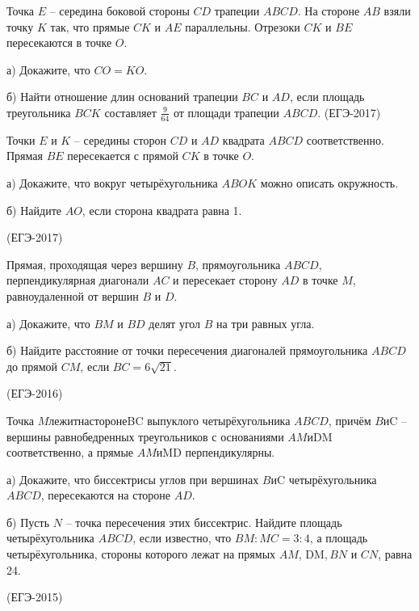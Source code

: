 \documentclass[c,12pt]{beamer}  %
\begin{document}
	\begin{frame}
		\begin{block}{}
			Точка $E$ – середина боковой стороны $CD$ трапеции $ABCD$. На
			стороне $AB$ взяли точку $K$ так, что прямые $CK$ и $AE$ параллельны. Отрезоки $CK$ и $BE$ пересекаются в точке $O$.
			
			а) Докажите, что $CO = KO$.
			
			б) Найти отношение длин оснований трапеции $BC$ и $AD$, если
			площадь треугольника $BCK$ составляет $\frac{9}{64}$ от площади трапеции
		 $ABCD$.
			(ЕГЭ-2017)
		\end{block}
	\end{frame}

	\begin{frame}
		\begin{block}{}
			Точки $E$ и $K$ – середины сторон $CD$ и $AD$ квадрата $ABCD$ соответственно. Прямая $BE$ пересекается с прямой $CK$ в точке $O$.
			
			а) Докажите, что вокруг четырёхугольника $ABOK$ можно
			описать окружность.
			
			б) Найдите $AO$, если сторона квадрата равна 1.
			
			(ЕГЭ-2017)
		\end{block}
	\end{frame}

	\begin{frame}
		\begin{block}{}
			Прямая, проходящая через вершину $B$, прямоугольника $ABCD$,
			перпендикулярная диагонали $AC$ и пересекает сторону $AD$ в
			точке $M$, равноудаленной от вершин $B$ и $D$.
			
			а) Докажите, что $BM$ и $BD$ делят угол $B$ на три равных угла.
			
			б) Найдите расстояние от точки пересечения диагоналей
			прямоугольника $ABCD$ до прямой $CM$, если $BC = 6 \sqrt{21}$.
			
			(ЕГЭ-2016)
		\end{block}
	\end{frame}

	\begin{frame}
		\begin{block}{}
			Точка $M лежит на стороне $BC выпуклого четырёхугольника
		 $ABCD$, причём $B и $C – вершины равнобедренных треугольников
			с основаниями $AM и $DM соответственно, а прямые $AM и $MD
			перпендикулярны.
			
			а) Докажите, что биссектрисы углов при вершинах $B и $C
			четырёхугольника $ABCD$, пересекаются на стороне $AD$.
			
			б) Пусть $N$ – точка пересечения этих биссектрис. Найдите
			площадь четырёхугольника $ABCD$, если известно, что
		 $BM : MC = 3 : 4$, а площадь четырёхугольника, стороны
			которого лежат на прямых $AM$, DM$, BN$ и $CN$, равна 24.
			
			(ЕГЭ-2015)
		\end{block}
	\end{frame}
\end{document}
